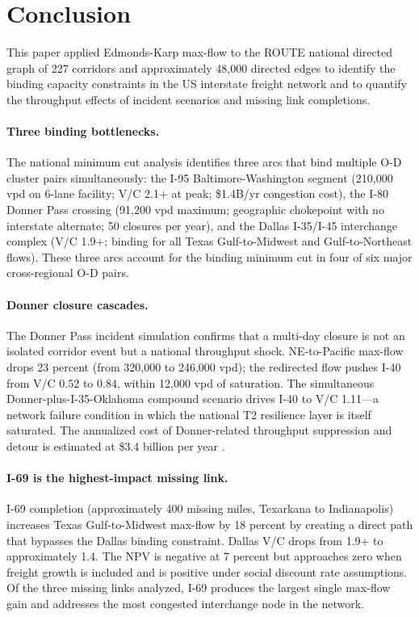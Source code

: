 \section{Conclusion}
\label{sec:conclusion}

This paper applied Edmonds-Karp max-flow to the ROUTE national directed graph of 227 corridors and approximately 48,000 directed edges to identify the binding capacity constraints in the US interstate freight network and to quantify the throughput effects of incident scenarios and missing link completions.

\paragraph{Three binding bottlenecks.} The national minimum cut analysis identifies three arcs that bind multiple O-D cluster pairs simultaneously: the I-95 Baltimore-Washington segment (210,000 vpd on 6-lane facility; V/C 2.1+ at peak; \$1.4B/yr congestion cost), the I-80 Donner Pass crossing (91,200 vpd maximum; geographic chokepoint with no interstate alternate; 50 closures per year), and the Dallas I-35/I-45 interchange complex (V/C 1.9+; binding for all Texas Gulf-to-Midwest and Gulf-to-Northeast flows). These three arcs account for the binding minimum cut in four of six major cross-regional O-D pairs.

\paragraph{Donner closure cascades.} The Donner Pass incident simulation confirms that a multi-day closure is not an isolated corridor event but a national throughput shock. NE-to-Pacific max-flow drops 23 percent (from 320,000 to 246,000 vpd); the redirected flow pushes I-40 from V/C 0.52 to 0.84, within 12,000 vpd of saturation. The simultaneous Donner-plus-I-35-Oklahoma compound scenario drives I-40 to V/C 1.11---a network failure condition in which the national T2 resilience layer is itself saturated. The annualized cost of Donner-related throughput suppression and detour is estimated at \$3.4 billion per year \citep{ATRI_costs2024}.

\paragraph{I-69 is the highest-impact missing link.} I-69 completion (approximately 400 missing miles, Texarkana to Indianapolis) increases Texas Gulf-to-Midwest max-flow by 18 percent by creating a direct path that bypasses the Dallas binding constraint. Dallas V/C drops from 1.9+ to approximately 1.4. The NPV is negative at 7 percent but approaches zero when freight growth is included and is positive under social discount rate assumptions. Of the three missing links analyzed, I-69 produces the largest single max-flow gain and addresses the most congested interchange node in the network.

